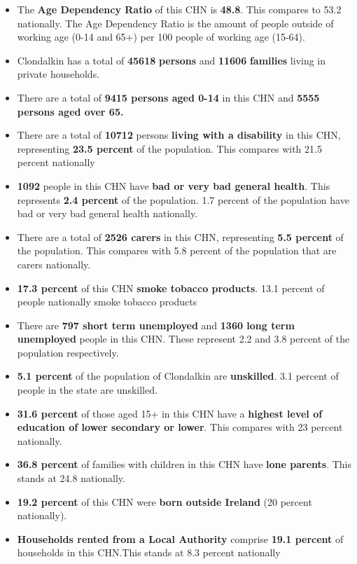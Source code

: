 \documentclass{article}
\begin{document}
\begin{itemize}

\item The \textbf{Age Dependency Ratio} of this CHN is  \textbf{48.8}. This compares to 53.2 nationally. The Age Dependency Ratio is the amount of people outside of working age (0-14 and 65+) per 100 people of working age (15-64). 

\item Clondalkin has a total of \textbf{\num{45618}} \textbf{persons} and  \textbf{\num{11606}} \textbf{families} living in private households.

\item There are a total of \textbf{\num{9415} persons aged 0-14} in this CHN and \textbf{\num{5555} persons aged over 65.} 

\item There are a total of \textbf{\num{10712}} persons \textbf{living with a disability} in this CHN, representing \textbf{23.5 percent} of the population. This compares with  21.5 percent nationally

\item \textbf{\num{1092}} people in this CHN have \textbf{bad or very bad general health}. This represents \textbf{2.4 percent} of the population. 1.7 percent of the population have bad or very bad general health nationally. 

\item There are a total of \textbf{\num{2526} carers} in this CHN, representing \textbf{5.5 percent} of the population. This compares with 5.8 percent of the population that are carers nationally. 

\item \textbf{17.3 percent} of this CHN \textbf{smoke tobacco products}. 13.1 percent of people nationally smoke tobacco products

\item There are \textbf{\num{797} short term unemployed} and \textbf{\num{1360} long term unemployed} people in this CHN. These represent 2.2 and 3.8 percent of the population respectively.

\item  \textbf{5.1 percent} of the population of Clondalkin are \textbf{unskilled}. 3.1 percent of people in the state are unskilled.

\item \textbf{31.6 percent} of those aged 15+ in this CHN have a \textbf{highest level of education of lower secondary or lower}. This compares with 23 percent nationally. 

\item \textbf{36.8 percent} of families with children in this CHN have \textbf{lone parents}. This stands at 24.8 nationally.

\item \textbf{19.2 percent} of this CHN were \textbf{born outside Ireland} (20 percent nationally).

\item \textbf{Households rented from a Local Authority} comprise \textbf{19.1 percent} of households in this CHN.This stands at 8.3 percent nationally

\end{itemize}
\end{document}
